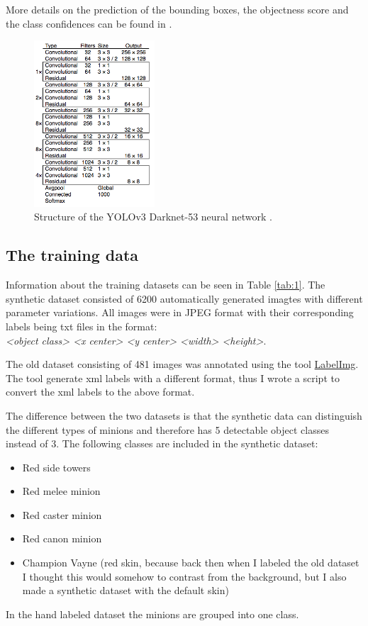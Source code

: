 More details on the prediction of the bounding boxes, the objectness score and the class confidences can be found in \cite{redmon2018yolov3}.

\begin{figure}
\centering
\includegraphics[width=0.4\textwidth]{figures/yolov3.png}
\caption{Structure of the YOLOv3 Darknet-53 neural network \cite{redmon2018yolov3}.}
\label{fig:darknet}
\end{figure}

\subsection{The training data}
Information about the training datasets can be seen in Table \ref{tab:1}.
The synthetic dataset consisted of 6200 automatically generated imagtes with different parameter variations.
All images were in JPEG format with their corresponding labels being txt files in the format:\\
\textit{<object class> <x center> <y center> <width> <height>}.

The old dataset consisting of 481 images was annotated using the tool \href{https://github.com/tzutalin/labelImg}{LabelImg}.
The tool generate xml labels with a different format, thus I wrote a script to convert the xml labels to the above format.

The difference between the two datasets is that the synthetic data can distinguish the different types of minions and therefore has 5 detectable object classes instead of 3.
The following classes are included in the synthetic dataset:
\begin{itemize}
\item Red side towers
\item Red melee minion
\item Red caster minion
\item Red canon minion
\item Champion Vayne (red skin, because back then when I labeled the old dataset I thought this would somehow to contrast from the background, but I also made a synthetic dataset with the default skin)
\end{itemize}
In the hand labeled dataset the minions are grouped into one class.

